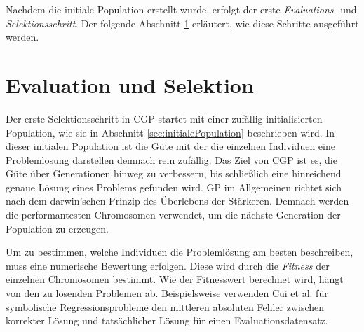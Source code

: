 Nachdem die initiale Population erstellt wurde, erfolgt der erste \emph{Evaluations-} und \emph{Selektionsschritt}. 
Der folgende Abschnitt \ref{sec:evalUndSelektion} erläutert, wie diese Schritte ausgeführt werden.


\section{Evaluation und Selektion}
\label{sec:evalUndSelektion}

Der erste Selektionsschritt in CGP startet mit einer zufällig initialisierten Population, wie sie in Abschnitt \ref{sec:initialePopulation} beschrieben wird.
In dieser initialen Population ist die Güte mit der die einzelnen Individuen eine Problemlösung darstellen demnach rein zufällig.
Das Ziel von CGP ist es, die Güte über Generationen hinweg zu verbessern, bis schließlich eine hinreichend genaue Lösung eines Problems gefunden wird.
GP im Allgemeinen richtet sich nach dem darwin'schen Prinzip des Überlebens der Stärkeren.
Demnach werden die performantesten Chromosomen verwendet, um die nächste Generation der Population zu erzeugen. \cite{koza_survey_1995}

Um zu bestimmen, welche Individuen die Problemlösung am besten beschreiben, muss eine numerische Bewertung erfolgen.
Diese wird durch die \emph{Fitness} der einzelnen Chromosomen bestimmt. \cite{koza_survey_1995}
Wie der Fitnesswert berechnet wird, hängt von den zu lösenden Problemen ab.
Beispielsweise verwenden Cui et al. für symbolische Regressionsprobleme den mittleren absoluten Fehler zwischen korrekter Lösung und tatsächlicher Lösung für einen Evaluationsdatensatz. \cite{affenzeller_positional_2024}

